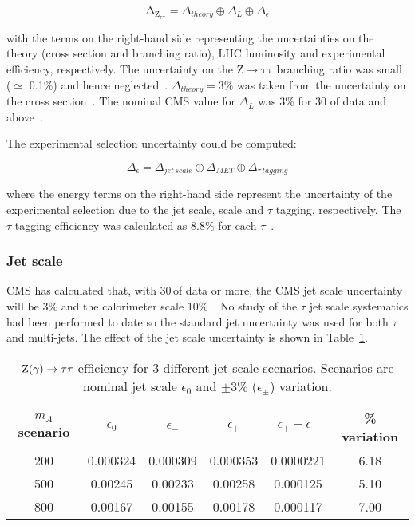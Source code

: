 \begin{equation}
	\mathrm{\Delta_{Z_{\tau \tau}}} = \Delta_{theory} \oplus \Delta_{L} \oplus \Delta_{\epsilon}
\end{equation}

with the terms on the right-hand side representing the uncertainties on the theory (cross section and branching ratio), LHC luminosity and experimental efficiency, respectively. The uncertainty on the $\mathrm{Z \rightarrow \tau \tau}$ branching ratio was small ($\simeq$ 0.1\%) and hence neglected~\cite{pdg2006}. $\Delta_{theory} = 3\%$ was taken from the uncertainty on the cross section~\cite{citeulike:891490}. The nominal CMS value for $\Delta_{L}$ was 3\% for 30 \fb of data and above~\cite{CMS_TDR_PHYS_vol2}.

The experimental selection uncertainty could be computed:

\begin{equation}
	\Delta_{\epsilon} = \Delta_{jet\,scale} \oplus \Delta_{MET} \oplus \Delta_{\tau\,tagging}
\end{equation}

where the energy terms on the right-hand side represent the uncertainty of the experimental selection due to the jet scale, \MET scale and $\tau$ tagging, respectively. The $\tau$ tagging efficiency was calculated as 8.8\% for each $\tau$~\cite{citeulike:905602}. 

\subsubsection{Jet scale}
CMS has calculated that, with 30\,\fb of data or more, the CMS jet scale uncertainty will be 3\% and the calorimeter scale 10\%~\cite{CMS_TDR_PHYS_vol2}. No study of the $\tau$ jet scale systematics had been performed to date so the standard jet uncertainty was used for both $\tau$ and multi-jets. The effect of the jet scale uncertainty is shown in Table~\ref{tab:jetScale}.

\begin{table}[!Hh]
	\centering
	\begin{tabular}{|c|c|c|c|c|c|}
	\hline
	$m_{A}$ scenario & $\epsilon_{0}$ & $\epsilon_{-}$ & $\epsilon_{+}$ & $\epsilon_{+} - \epsilon_{-}$ & \% variation\\ \hline
	200\GeVcc & 0.000324 & 0.000309 & 0.000353 & 0.0000221 & 6.18\\ \hline
	500\GeVcc & 0.00245 & 0.00233 & 0.00258 & 0.000125 & 5.10\\ \hline
	800\GeVcc & 0.00167 & 0.00155 & 0.00178 & 0.000117 & 7.00\\ \hline
    \end{tabular}
\caption{$\mathrm{Z(\gamma) \rightarrow \tau\tau}$ efficiency for 3 different jet scale scenarios. Scenarios are nominal jet scale $\epsilon_{0}$ and $\pm3\%$ ($\epsilon_{\pm}$) variation.\label{tab:jetScale}}
\end{table}

